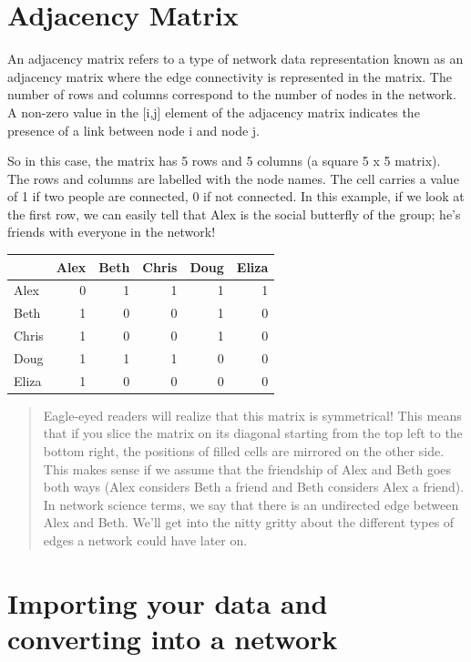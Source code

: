 \documentclass[
]{book}
\begin{document}
\section{Adjacency Matrix}\label{adjacency-matrix}

An adjacency matrix refers to a type of network data representation known as an adjacency matrix where the edge connectivity is represented in the matrix. The number of rows and columns correspond to the number of nodes in the network. A non-zero value in the {[}i,j{]} element of the adjacency matrix indicates the presence of a link between node i and node j.

So in this case, the matrix has 5 rows and 5 columns (a square 5 x 5 matrix). The rows and columns are labelled with the node names. The cell carries a value of 1 if two people are connected, 0 if not connected. In this example, if we look at the first row, we can easily tell that Alex is the social butterfly of the group; he's friends with everyone in the network!

\begin{table}
\centering
\begin{tabular}{l|r|r|r|r|r}
\hline
  & Alex & Beth & Chris & Doug & Eliza\\
\hline
Alex & 0 & 1 & 1 & 1 & 1\\
\hline
Beth & 1 & 0 & 0 & 1 & 0\\
\hline
Chris & 1 & 0 & 0 & 1 & 0\\
\hline
Doug & 1 & 1 & 1 & 0 & 0\\
\hline
Eliza & 1 & 0 & 0 & 0 & 0\\
\hline
\end{tabular}
\end{table}

\begin{quote}
Eagle-eyed readers will realize that this matrix is symmetrical! This means that if you slice the matrix on its diagonal starting from the top left to the bottom right, the positions of filled cells are mirrored on the other side. This makes sense if we assume that the friendship of Alex and Beth goes both ways (Alex considers Beth a friend and Beth considers Alex a friend). In network science terms, we say that there is an undirected edge between Alex and Beth. We'll get into the nitty gritty about the different types of edges a network could have later on.
\end{quote}

\section{Importing your data and converting into a network}\label{importing-your-data-and-converting-into-a-network}
\end{document}
